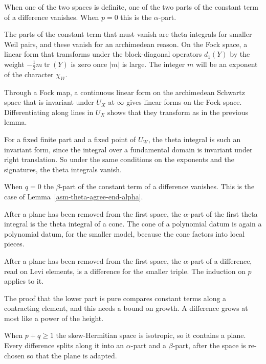 When one of the two spaces is definite, one of the two parts of the constant
term of a difference vanishes. When $p=0$ this is the $\alpha$-part.

The parts of the constant term that must vanish are theta integrals for
smaller Weil pairs, and these vanish for an archimedean reason. On the Fock
space, a linear form that transforms under the block-diagonal operators $d_1(Y)$
by the weight $-\frac12m\operatorname{tr}(Y)$ is zero once $|m|$ is large. The
integer $m$ will be an exponent of the character $\chi_W$.

Through a Fock map, a continuous linear form on the archimedean Schwartz space
that is invariant under $U_X$ at $\infty$ gives linear forms on the Fock space.
Differentiating along lines in $U_X$ shows that they transform as in the
previous lemma.

For a fixed finite part and a fixed point of $U_W$, the theta integral is such
an invariant form, since the integral over a fundamental domain is invariant
under right translation. So under the same conditions on the exponents and the
signatures, the theta integrals vanish.

When $q=0$ the $\beta$-part of the constant term of a difference vanishes.
This is the case of Lemma~\ref{asm-theta-agree-end-alpha}.

After a plane has been removed from the first space, the $\alpha$-part of the
first theta integral is the theta integral of a cone. The cone of a polynomial
datum is again a polynomial datum, for the smaller model, because the cone
factors into local pieces.

After a plane has been removed from the first space, the $\alpha$-part of a
difference, read on Levi elements, is a difference for the smaller triple. The
induction on $p$ applies to it.

The proof that the lower part is pure compares constant terms along a
contracting element, and this needs a bound on growth. A difference grows at
most like a power of the height.

When $p+q\geq1$ the skew-Hermitian space is isotropic, so it contains a plane.
Every difference splits along it into an $\alpha$-part and a $\beta$-part,
after the space is re-chosen so that the plane is adapted.

